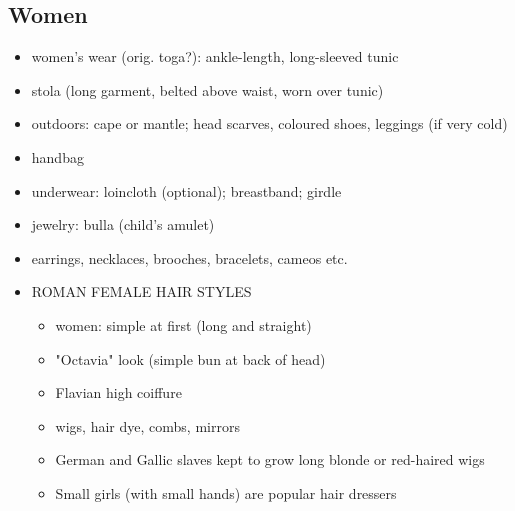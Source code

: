 \documentclass[12pt, twoside]{article}
\begin{document}
\subsection{Women}
\begin{itemize}
\item women's wear (orig. toga?): ankle-length, long-sleeved tunic 
\item stola (long garment, belted above waist, worn over tunic)
\item outdoors: cape or mantle; head scarves, coloured shoes, leggings (if very cold) 
\item handbag
\item underwear: loincloth (optional); breastband; girdle
\item jewelry: bulla (child's amulet)
\item earrings, necklaces, brooches, bracelets, cameos etc.
\item ROMAN FEMALE HAIR STYLES
	\begin{itemize}
	\item women: simple at first (long and straight)
	\item "Octavia" look (simple bun at back of head)
	\item Flavian high coiffure
	\item wigs, hair dye, combs, mirrors
	\item German and Gallic slaves kept to grow long blonde or red-haired wigs
	\item Small girls (with small hands) are popular hair dressers
	\end{itemize}
\end{itemize}
\end{document}
